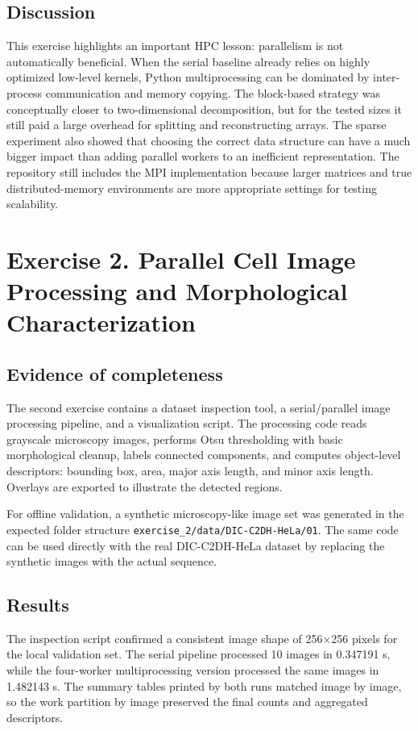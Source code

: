 \documentclass[conference]{IEEEtran}
\begin{document}
\subsection{Discussion}
This exercise highlights an important HPC lesson: parallelism is not automatically beneficial. When the serial baseline already relies on highly optimized low-level kernels, Python multiprocessing can be dominated by inter-process communication and memory copying. The block-based strategy was conceptually closer to two-dimensional decomposition, but for the tested sizes it still paid a large overhead for splitting and reconstructing arrays. The sparse experiment also showed that choosing the correct data structure can have a much bigger impact than adding parallel workers to an inefficient representation. The repository still includes the MPI implementation because larger matrices and true distributed-memory environments are more appropriate settings for testing scalability.

\section{Exercise 2. Parallel Cell Image Processing and Morphological Characterization}
\subsection{Evidence of completeness}
The second exercise contains a dataset inspection tool, a serial/parallel image processing pipeline, and a visualization script. The processing code reads grayscale microscopy images, performs Otsu thresholding with basic morphological cleanup, labels connected components, and computes object-level descriptors: bounding box, area, major axis length, and minor axis length. Overlays are exported to illustrate the detected regions.

For offline validation, a synthetic microscopy-like image set was generated in the expected folder structure \texttt{exercise\_2/data/DIC-C2DH-HeLa/01}. The same code can be used directly with the real DIC-C2DH-HeLa dataset by replacing the synthetic images with the actual sequence.

\subsection{Results}
The inspection script confirmed a consistent image shape of 256$\times$256 pixels for the local validation set. The serial pipeline processed 10 images in 0.347191 s, while the four-worker multiprocessing version processed the same images in 1.482143 s. The summary tables printed by both runs matched image by image, so the work partition by image preserved the final counts and aggregated descriptors.
\end{document}
